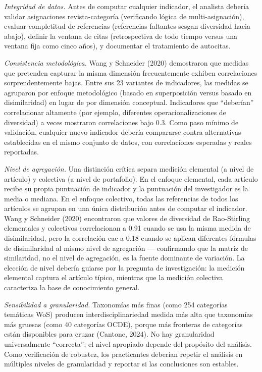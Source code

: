 \documentclass[
]{article}
\begin{document}
\emph{Integridad de datos.} Antes de computar cualquier indicador, el
analista debería validar asignaciones revista-categoría (verificando
lógica de multi-asignación), evaluar completitud de referencias
(referencias faltantes sesgan diversidad hacia abajo), definir la
ventana de citas (retrospectiva de todo tiempo versus una ventana fija
como cinco años), y documentar el tratamiento de autocitas.

\emph{Consistencia metodológica.} Wang y Schneider (2020) demostraron
que medidas que pretenden capturar la misma dimensión frecuentemente
exhiben correlaciones sorprendentemente bajas. Entre sus 23 variantes de
indicadores, las medidas se agruparon por enfoque metodológico (basado
en superposición versus basado en disimilaridad) en lugar de por
dimensión conceptual. Indicadores que ``deberían'' correlacionar
altamente (por ejemplo, diferentes operacionalizaciones de diversidad) a
veces mostraron correlaciones bajo 0.3. Como paso mínimo de validación,
cualquier nuevo indicador debería compararse contra alternativas
establecidas en el mismo conjunto de datos, con correlaciones esperadas
y reales reportadas.

\emph{Nivel de agregación.} Una distinción crítica separa medición
elemental (a nivel de artículo) y colectiva (a nivel de portafolio). En
el enfoque elemental, cada artículo recibe su propia puntuación de
indicador y la puntuación del investigador es la media o mediana. En el
enfoque colectivo, todas las referencias de todos los artículos se
agrupan en una única distribución antes de computar el indicador. Wang y
Schneider (2020) encontraron que valores de diversidad de Rao-Stirling
elementales y colectivos correlacionan a 0.91 cuando se usa la misma
medida de disimilaridad, pero la correlación cae a 0.18 cuando se
aplican diferentes fórmulas de disimilaridad al mismo nivel de
agregación --- confirmando que la matriz de similaridad, no el nivel de
agregación, es la fuente dominante de variación. La elección de nivel
debería guiarse por la pregunta de investigación: la medición elemental
captura el artículo típico, mientras que la medición colectiva
caracteriza la base de conocimiento general.

\emph{Sensibilidad a granularidad.} Taxonomías más finas (como 254
categorías temáticas WoS) producen interdisciplinariedad medida más alta
que taxonomías más gruesas (como 40 categorías OCDE), porque más
fronteras de categorías están disponibles para cruzar (Cantone, 2024).
No hay granularidad universalmente ``correcta''; el nivel apropiado
depende del propósito del análisis. Como verificación de robustez, los
practicantes deberían repetir el análisis en múltiples niveles de
granularidad y reportar si las conclusiones son estables.
\end{document}
